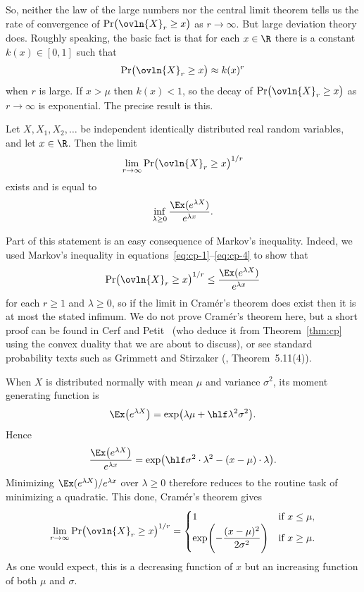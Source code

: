So, neither the law of the large numbers nor the central limit theorem
tells us the rate of convergence of $\Pr\bigl(\ovln{X}_r \geq x\bigr)$ as
$r \to \infty$.  But large deviation theory does.  Roughly speaking, the
basic fact is that for each $x \in \R$ there is a constant $k(x) \in [0,
  1]$ such that
\[
\Pr\bigl(\ovln{X}_r \geq x\bigr) 
\approx
k(x)^r
\]
when $r$ is large.  If $x > \mu$ then $k(x) < 1$, so the decay of
$\Pr\bigl(\ovln{X}_r \geq x\bigr)$ as $r \to \infty$ is exponential.  The
precise result is this.

\begin{thm}[Cram\'er]
%
%
% 
Let $X, X_1, X_2, \ldots$ be independent identically distributed real
random variables, and let $x \in \R$.  Then the limit
\[
\lim_{r \to \infty} \Pr\bigl(\ovln{X}_r \geq x\bigr)^{1/r}
\]
exists and is equal to
\[
\inf_{\lambda \geq 0} \frac{\Ex(e^{\lambda X})}{e^{\lambda x}}.
\]
\end{thm}

Part of this statement is an easy consequence of Markov's%
%
% 
inequality.  Indeed, we used Markov's inequality in
equations~\eqref{eq:cp-1}--\eqref{eq:cp-4} to show that
\[
\Pr\bigl(\ovln{X}_r \geq x\bigr)^{1/r} 
\leq 
\frac{\Ex(e^{\lambda X})}{e^{\lambda x}}
\]
for each $r \geq 1$ and $\lambda \geq 0$, so if the limit in Cram\'er's
theorem does exist then it is at most the stated infimum.  We do not prove
Cram\'er's theorem here, but a short proof can be found in Cerf%
%
%
and Petit~\cite{CePe}%
%
% 
(who deduce it from Theorem~\ref{thm:cp} using the convex duality that we
are about to discuss), or see standard probability texts such as Grimmett
and Stirzaker (\cite{GrSt}, Theorem~5.11(4)).

\begin{example}
When $X$ is distributed normally%
% 
% 
with mean $\mu$ and variance $\sigma^2$,
its moment generating function is
\[
\Ex\bigl(e^{\lambda X}\bigr)
=
\exp\bigl(\lambda\mu + \hlf \lambda^2 \sigma^2\bigr).
\]
Hence
\[
\frac{\Ex\bigl(e^{\lambda X}\bigr)}{e^{\lambda x}}
=
\exp\bigl(
\hlf \sigma^2 \cdot \lambda^2 - (x - \mu) \cdot \lambda
\bigr).
\]
Minimizing $\Ex(e^{\lambda X})/e^{\lambda x}$ over $\lambda \geq 0$
therefore reduces to the routine task of minimizing a quadratic.  This
done, Cram\'er's theorem gives
\[
\lim_{r \to \infty} \Pr\bigl(\ovln{X}_r \geq x\bigr)^{1/r}
=
\begin{cases}
\displaystyle
1       &\text{if } x \leq \mu, \\
\displaystyle
\exp \Biggl( - \frac{(x - \mu)^2}{2\sigma^2} \Biggr)      &
\text{if } x \geq \mu.
\end{cases}
\]
As one would expect, this is a decreasing function of $x$ but an increasing
function of both $\mu$ and $\sigma$.
\end{example}


